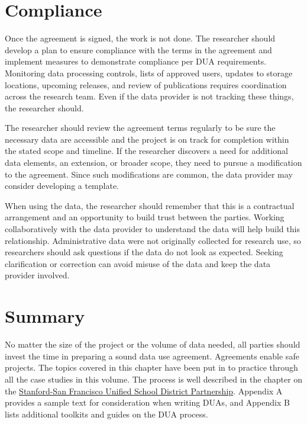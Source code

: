 \hypertarget{compliance}{%
\section{Compliance}\label{compliance}}

Once the agreement is signed, the work is not done. The researcher should develop a plan to ensure compliance with the terms in the agreement and implement measures to demonstrate compliance per DUA requirements. Monitoring data processing controls, lists of approved users, updates to storage locations, upcoming releases, and review of publications requires coordination across the research team. Even if the data provider is not tracking these things, the researcher should.

The researcher should review the agreement terms regularly to be sure the necessary data are accessible and the project is on track for completion within the stated scope and timeline. If the researcher discovers a need for additional data elements, an extension, or broader scope, they need to pursue a modification to the agreement. Since such modifications are common, the data provider may consider developing a template.

When using the data, the researcher should remember that this is a contractual arrangement and an opportunity to build trust between the parties. Working collaboratively with the data provider to understand the data will help build this relationship. Administrative data were not originally collected for research use, so researchers should ask questions if the data do not look as expected. Seeking clarification or correction can avoid misuse of the data and keep the data provider involved.

\hypertarget{summary}{%
\section{Summary}\label{summary}}

No matter the size of the project or the volume of data needed, all parties should invest the time in preparing a sound data use agreement. Agreements enable safe projects. The topics covered in this chapter have been put in to practice through all the case studies in this volume. The process is well described in the chapter on the \protect\hyperlink{sfusd}{Stanford-San Francisco Unified School District Partnership}. Appendix A provides a sample text for consideration when writing DUAs, and Appendix B lists additional toolkits and guides on the DUA process.

